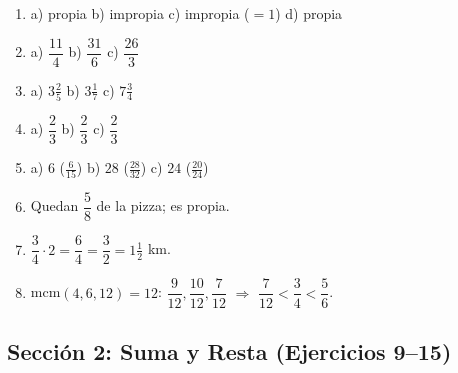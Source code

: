 \documentclass[12pt, letterpaper]{article}
\begin{document}
  \begin{enumerate}[leftmargin=*, label=\textbf{\arabic*.}]
    \item a) propia \quad b) impropia \quad c) impropia ($=1$) \quad d) propia

    \item a) $\dfrac{11}{4}$ \quad b) $\dfrac{31}{6}$ \quad c) $\dfrac{26}{3}$

    \item a) $3\frac{2}{5}$ \quad b) $3\frac{1}{7}$ \quad c) $7\frac{3}{4}$

    \item a) $\dfrac{2}{3}$ \quad b) $\dfrac{2}{3}$ \quad c) $\dfrac{2}{3}$

    \item a) $6$ ($\frac{6}{15}$) \quad b) $28$ ($\frac{28}{32}$) \quad c) $24$ ($\frac{20}{24}$)

    \item Quedan $\dfrac{5}{8}$ de la pizza; es propia.

    \item $\dfrac{3}{4} \cdot 2 = \dfrac{6}{4} = \dfrac{3}{2} = 1\frac{1}{2}$ km.

    \item mcm$(4,6,12) = 12$: $\dfrac{9}{12}, \dfrac{10}{12}, \dfrac{7}{12}$ $\Rightarrow$ $\dfrac{7}{12} < \dfrac{3}{4} < \dfrac{5}{6}$.
  \end{enumerate}

  \newpage

  \subsection*{Sección 2: Suma y Resta (Ejercicios 9--15)}
\end{document}
